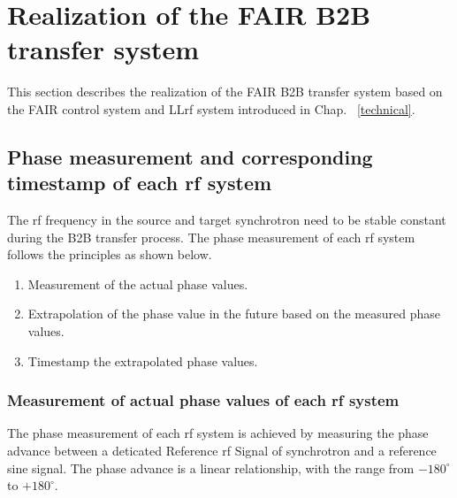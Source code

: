 \section{Realization of the FAIR B2B transfer system}
This section describes the realization of the FAIR B2B transfer system based on the FAIR control system and LLrf system introduced in Chap. ~\ref{technical}.
%
\subsection{Phase measurement and corresponding timestamp of each rf system}
The rf frequency in the source and target synchrotron need to be stable constant during the B2B transfer process. The phase measurement of each rf system follows the principles as shown below.

\begin{enumerate}
\item Measurement of the actual phase values.
\item Extrapolation of the phase value in the future based on the measured phase values.
\item Timestamp the extrapolated phase values.
\end{enumerate}
 \subsubsection{Measurement of actual phase values of each rf system}
The phase measurement of each rf system is achieved by measuring the phase advance between  a deticated Reference rf Signal of  synchrotron and a reference sine signal. The phase advance is a linear relationship, with the range from $-180^\circ$ to $+180^\circ$. 


